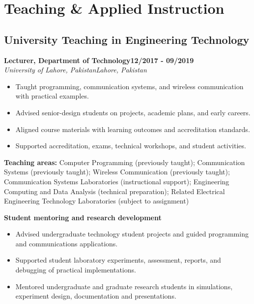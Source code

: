 \documentclass[9pt,letterpaper]{extarticle}
\newcommand{\role}[4]{%
  \Needspace{4\baselineskip}\textbf{#1}\hfill\textbf{#2}\\[-1pt]
  \textit{#3}\hfill\textit{#4}\par}
\begin{document}
\section{Teaching \& Applied Instruction}
\subsection{University Teaching in Engineering Technology}
\role{Lecturer, Department of Technology}{12/2017 - 09/2019}{University of Lahore, Pakistan}{Lahore, Pakistan}
\begin{itemize}
\item Taught programming, communication systems, and wireless communication with practical examples.
\item Advised senior-design students on projects, academic plans, and early careers.
\item Aligned course materials with learning outcomes and accreditation standards.
\item Supported accreditation, exams, technical workshops, and student activities.
\end{itemize}
\vspace{1pt}
{\small\textbf{Teaching areas:} Computer Programming (previously taught); Communication Systems (previously taught); Wireless Communication (previously taught); Communication Systems Laboratories (instructional support); Engineering Computing and Data Analysis (technical preparation); Related Electrical Engineering Technology Laboratories (subject to assignment)}\par
{}\noindent\textbf{Student mentoring and research development}\par
\begin{itemize}
\item Advised undergraduate technology student projects and guided programming and communications applications.
\item Supported student laboratory experiments, assessment, reports, and debugging of practical implementations.
\item Mentored undergraduate and graduate research students in simulations, experiment design, documentation and presentations.
\end{itemize}
\end{document}
